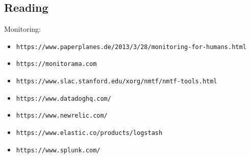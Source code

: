 \documentclass[xga]{xdvislides}
\begin{document}
\subsection{Reading}

Monitoring:
\begin{itemize}
	\item {\tt https://www.paperplanes.de/2013/3/28/monitoring-for-humans.html}
	\item {\tt https://monitorama.com}
	\item {\tt https://www.slac.stanford.edu/xorg/nmtf/nmtf-tools.html}
	\item {\tt https://www.datadoghq.com/}
	\item {\tt https://www.newrelic.com/}
	\item {\tt https://www.elastic.co/products/logstash}
	\item {\tt https://www.splunk.com/}
\end{itemize}
\end{document}
